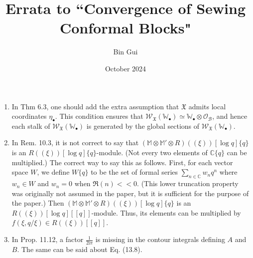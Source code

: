 \documentclass[11pt,b5paper,notitlepage]{article}
\title{Errata to ``Convergence of Sewing Conformal Blocks"}
\author{Bin Gui}
\date{October 2024}
\begin{document}
\sloppy

\maketitle


\begin{enumerate}
\item In Thm 6.3, one should add the extra assumption that $\mathfrak X$ admits local coordinates $\eta_\bullet$. This condition ensures that $\mathscr W_{\mathfrak X}(\mathbb W_\bullet)\simeq \mathbb W_\bullet\otimes\mathscr O_{\mathcal B}$, and hence each stalk of $\mathscr W_{\mathfrak X}(\mathbb W_\bullet)$ is generated by the global sections of $\mathscr W_{\mathfrak X}(\mathbb W_\bullet)$.

\item In Rem. 10.3, it is not correct to say that $(\mathbb M\otimes\mathbb M'\otimes R)((\xi))[\log q]\{q\}$ is an $R((\xi))[\log q]\{q\}$-module. (Not every two elements of $\mathbb C\{q\}$ can be multiplied.) The correct way to say this as follows. First, for each vector space $W$, we define $W\{q\}$ to be the set of formal series $\sum_{n\in\mathbb C}w_nq^n$ where $w_n\in W$ and $w_n=0$ when $\Re(n)<<0$. (This lower truncation property was originally not assumed in the paper, but it is sufficient for the purpose of the paper.) Then $(\mathbb M\otimes\mathbb M'\otimes R)((\xi))[\log q]\{q\}$ is an $R((\xi))[\log q][[q]]$-module. Thus, its elements can be multiplied by $f(\xi,q/\xi)\in R((\xi))[[q]]$.


\item In Prop. 11.12, a factor $\frac 1{2\mathrm{i}\pi}$ is missing in the contour integrals defining $A$ and $B$. The same can be said about Eq. (13.8).
\end{enumerate}
\end{document}
